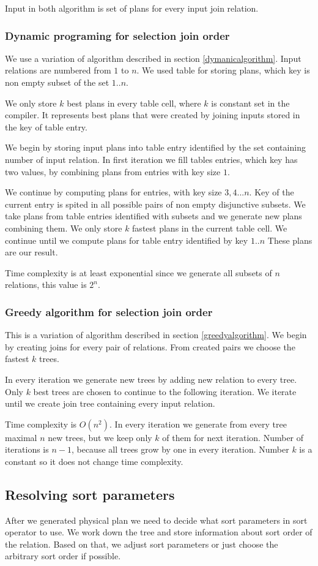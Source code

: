 Input in both algorithm is set of plans for every input join relation.

\subsubsection{Dynamic programing for selection join order}

We use a variation of algorithm described in section \ref{dymanicalgorithm}. Input relations are numbered from $1$ to $n$. We used table for storing plans, which key is non empty subset of the set ${1..n}$.

We only store $k$ best plans in every table cell, where $k$ is constant set in the compiler. It represents best plans that were created by joining inputs stored in the key of table entry.

We begin by storing input plans into table entry identified by the set containing number of input relation. In first iteration we fill tables entries, which key has two values, by combining plans from entries with key size $1$.

We continue by computing plans for entries, with key size $3,4...n$. Key of the current entry is spited in all possible pairs of non empty disjunctive subsets. We take plans from table entries identified with subsets and we generate new plans combining them. We only store $k$ fastest plans in the current table cell.
We continue until we compute plans for table entry identified by key ${1..n}$ These plans are our result.

Time complexity is at least exponential since we generate all subsets of $n$ relations, this value is $2^n$.


\subsubsection{Greedy algorithm for selection join order}
 This is a variation of algorithm described in section \ref{greedyalgorithm}. We begin by creating joins for every pair of relations. From created pairs we choose the fastest $k$ trees.
 
 In every iteration we generate new trees by adding new relation to every tree. Only $k$ best trees are chosen to continue to the following iteration. We iterate until we create join tree containing every input relation.
 
 Time complexity is $O(n^2)$. In every iteration we generate from every tree maximal $n$ new trees, but we keep only $k$ of them for next iteration. Number of iterations is $n-1$, because all trees grow by one in every iteration. Number $k$ is a constant so it does not change time complexity.
 
\subsection{Resolving sort parameters}

After we generated physical plan we need to decide what sort parameters in sort operator to use. We work down the tree and store information about sort order of the relation. Based on that, we adjust sort parameters or just choose the arbitrary sort order if possible.

